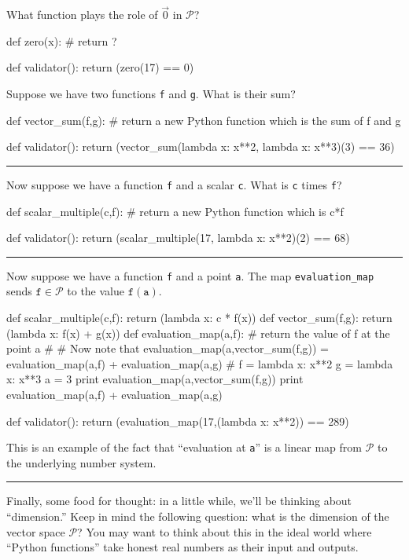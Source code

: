 \documentclass{ximera}
\begin{document}
\begin{question}
  What function plays the role of $\vec{0}$ in $\mathcal{P}$?
  \begin{solution}
    \begin{python}
def zero(x):
  # return ?  
    
def validator():
  return (zero(17) == 0)
    \end{python}
  \end{solution}

  Suppose we have two functions \texttt{f} and \texttt{g}.  What is their sum?
  \begin{solution}
    \begin{python}
def vector_sum(f,g):
  # return a new Python function which is the sum of f and g
    
def validator():
  return (vector_sum(lambda x: x**2, lambda x: x**3)(3) == 36)
    \end{python}
  \end{solution}

  \hrule

  Now suppose we have a function \texttt{f} and a scalar \texttt{c}.  What is \texttt{c} times \texttt{f}?
  \begin{solution}
    \begin{python}
def scalar_multiple(c,f):
  # return a new Python function which is c*f
    
def validator():
  return (scalar_multiple(17, lambda x: x**2)(2) == 68)
    \end{python}
  \end{solution}

  \hrule

    Now suppose we have a function \texttt{f} and a point \texttt{a}.  The map \texttt{evaluation_map} sends $\texttt{f} \in \mathcal{P}$ to the value $\texttt{f}(\texttt{a})$.
  \begin{solution}
    \begin{python}
def scalar_multiple(c,f):
  return (lambda x: c * f(x))
def vector_sum(f,g):
  return (lambda x: f(x) + g(x))
def evaluation_map(a,f):
  # return the value of f at the point a
#
# Now note that evaluation_map(a,vector_sum(f,g)) = evaluation_map(a,f) + evaluation_map(a,g)
#
f = lambda x: x**2
g = lambda x: x**3
a = 3
print evaluation_map(a,vector_sum(f,g))
print evaluation_map(a,f) + evaluation_map(a,g)
    
def validator():
  return (evaluation_map(17,(lambda x: x**2)) == 289)
    \end{python}
  \end{solution}

  This is an example of the fact that ``evaluation at \texttt{a}'' is a linear map from $\mathcal{P}$ to the underlying number system.

  \hrule

  Finally, some food for thought: in a little while, we'll be thinking
  about ``dimension.''  Keep in mind the following question: what is
  the dimension of the vector space $\mathcal{P}$?  You may want to
  think about this in the ideal world where ``Python functions'' take
  honest real numbers as their input and outputs.
\end{question}
\end{document}
